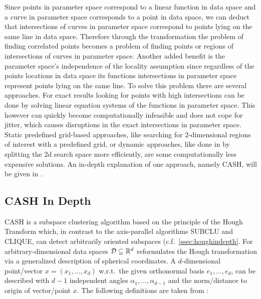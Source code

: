 Since points in parameter space correspond to a linear function in data space and a curve in parameter space corresponds to a point in data space, we can deduct that intersections of curves in parameter space correspond to points lying on the same line in data space. Therefore through the transformation the problem of finding correlated points becomes a problem of finding points or regions of intersections of curves in parameter space. Another added benefit is the parameter space's independence of the locality assumption since regardless of the points locations in data space its functions intersections in parameter space represent points lying on the same line.  To solve this problem there are several approaches. For exact results looking for points with high intersections can be done by solving linear equation systems of the functions in parameter space. This however can quickly become computationally infeasible and does not cope for jitter, which causes disruptions in the exact intersections in parameter space. Static predefined grid-based approaches, like searching for 2-dimensional regions of interest with a predefined grid, or dynamic approaches, like done in \textcite{CASHachtert2008global} by splitting the 2d search space more efficiently, are some computationally less expensive solutions. An in-depth explanation of one approach, namely \acf{CASH}, will be given in .

\subsection{CASH In Depth}\label{ssec:CASHindepth}
\acf{CASH} is a subspace clustering algorithm based on the principle of the Hough Transform which, in contrast to the axis-parallel algorithms \ac{SUBCLU}\cite{sublcukailing2004density} and \ac{CLIQUE}\cite{cliqueagrawal1998automatic}, can detect arbitrarily oriented subspaces (c.f.~\autoref{ssec:houghindepth}. 
For arbitrary-dimensional data spaces $\mathcal{D} \subseteq \mathbb{R}^d$ \textcite{CASHachtert2008robust} reformulates the Hough transformation via a generalized description of spherical coordinates. A $d$-dimensional point/vector $x=(x_1,\dotsc,x_d)$ w.r.t.\ the given orthonormal basis $e_1,\dotsc,e_d$, can be described with $d-1$ independent angles $\alpha_1,\dotsc,\alpha_{d-1}$ and the norm/distance to origin of vector/point $x$. The following definitions are taken from \cite{CASHachtert2008robust}:

